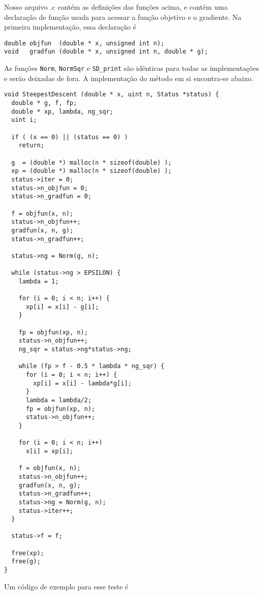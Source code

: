 \documentclass[letterpaper,11pt]{article}
\numberwithin{equation}{section}
\begin{document}
Nosso arquivo .c contém as definições das funções acima, e contém uma declaração de função
usada para acessar a função objetivo e o gradiente. Na primeira implementação, essa declaração
é
\begin{verbatim}
double objfun  (double * x, unsigned int n);
void   gradfun (double * x, unsigned int n, double * g);
\end{verbatim}
As funções \verb+Norm+, \verb+NormSqr+ e \verb+SD_print+ são idênticas para todas as
implementações e serão deixadas de fora. A implementação do método em si encontra-se abaixo.
\scriptsize
\begin{verbatim}
void SteepestDescent (double * x, uint n, Status *status) { 
  double * g, f, fp;
  double * xp, lambda, ng_sqr;
  uint i;

  if ( (x == 0) || (status == 0) )
    return;

  g  = (double *) malloc(n * sizeof(double) );
  xp = (double *) malloc(n * sizeof(double) );
  status->iter = 0;
  status->n_objfun = 0;
  status->n_gradfun = 0;

  f = objfun(x, n);
  status->n_objfun++;
  gradfun(x, n, g);
  status->n_gradfun++;

  status->ng = Norm(g, n);

  while (status->ng > EPSILON) {
    lambda = 1;

    for (i = 0; i < n; i++) {
      xp[i] = x[i] - g[i];
    }

    fp = objfun(xp, n);
    status->n_objfun++;
    ng_sqr = status->ng*status->ng;

    while (fp > f - 0.5 * lambda * ng_sqr) {
      for (i = 0; i < n; i++) {
        xp[i] = x[i] - lambda*g[i];
      }
      lambda = lambda/2;
      fp = objfun(xp, n);
      status->n_objfun++;
    }

    for (i = 0; i < n; i++)
      x[i] = xp[i];

    f = objfun(x, n);
    status->n_objfun++;
    gradfun(x, n, g);
    status->n_gradfun++;
    status->ng = Norm(g, n);
    status->iter++;
  }

  status->f = f;

  free(xp);
  free(g);
}
\end{verbatim}
Um código de exemplo para esse teste é
\end{document}
